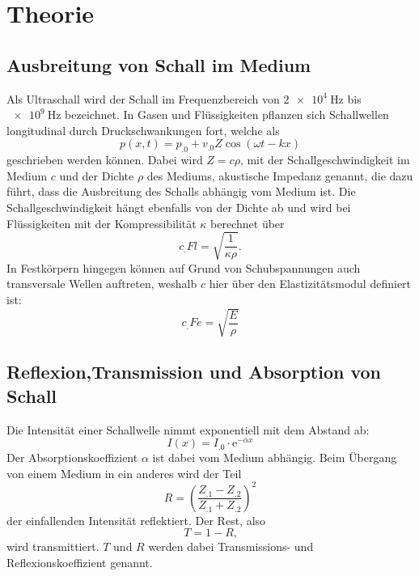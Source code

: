 \section{Theorie}
\label{sec:Theorie}

\subsection{Ausbreitung von Schall im Medium}
Als Ultraschall wird der Schall im Frequenzbereich von $\SI{2e4}{\hertz}$ bis $\SI{e9}{\hertz}$ bezeichnet.
In Gasen und Flüssigkeiten pflanzen sich Schallwellen longitudinal durch Druckschwankungen fort, welche als 
\[
p(x,t)=p_.0+v_.0 Z \cos(\omega t - kx)
\]
geschrieben werden können. Dabei wird $Z=c\rho$, mit der Schallgeschwindigkeit im Medium $c$ und der Dichte $\rho$ des Mediums, akustische Impedanz genannt, die dazu führt, dass die Ausbreitung des Schalls abhängig vom Medium ist.
Die Schallgeschwindigkeit hängt ebenfalls von der Dichte ab und wird bei Flüssigkeiten mit der Kompressibilität $\kappa$ berechnet über
\begin{equation}
c_.{Fl}=\sqrt{\frac{1}{\kappa\rho}}\label{eq:Fl}\text{.}
\end{equation}
In Festkörpern hingegen können auf Grund von Schubspannungen auch transversale Wellen auftreten, weshalb $c$ hier über den Elastizitätsmodul definiert ist:
\begin{equation}
c_.{Fe}=\sqrt{\frac{E}{\rho}}\label{eq:Fe}
\end{equation}
\subsection{Reflexion,Transmission und Absorption von Schall}
Die Intensität einer Schallwelle nimmt exponentiell mit dem Abstand ab:
\begin{equation}
I(x)=I_.0\cdot\mathrm{e}^{-\alpha x}\label{eq:I}
\end{equation}
Der Absorptionskoeffizient $\alpha$ ist dabei vom Medium abhängig.
Beim Übergang von einem Medium in ein anderes wird der Teil
\begin{equation}
R=\left(\frac{Z_.1-Z_.2}{Z_.1+Z_.2}\right)^2\label{eq:R}
\end{equation}
der einfallenden Intensität reflektiert. Der Rest, also
\begin{equation}
T=1-R\label{eq:T}\text{,}
\end{equation}
wird transmittiert. $T$ und $R$ werden dabei Transmissions- und Reflexionskoeffizient genannt.


